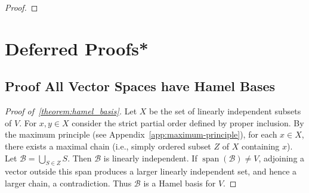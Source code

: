 \begin{proof}
\end{proof}

\section{Deferred Proofs*} \label{section:linear_deferred}

\subsection*{Proof All Vector Spaces have Hamel Bases}

\begin{proof}[Proof of~\ref{theorem:hamel_basis}]
Let $X$ be the set of linearly independent subsets of $V$.
For $x, y \in X$ consider the strict partial order defined by proper inclusion.
By the maximum principle (see Appendix~\ref{app:maximum-principle}), for each $x \in X$, there exists a maximal chain (i.e., simply ordered subset $Z$ of $X$ containing $x$).
Let $\mathcal B=\bigcup_{S\in Z}S$.  Then $\mathcal B$ is linearly independent.  If $\operatorname{span}(\mathcal B)\ne V$, adjoining a vector outside this span produces a larger linearly independent set, and hence a larger chain, a contradiction.  Thus $\mathcal B$ is a Hamel basis for $V$.
\end{proof}
